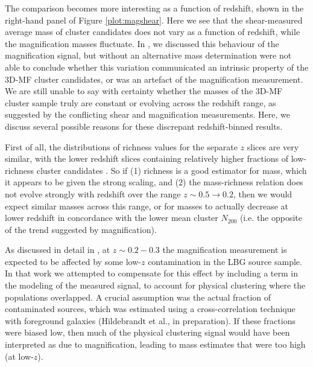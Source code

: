 The comparison becomes more interesting as a function of redshift, shown in the right-hand panel of Figure \ref{plot:magshear}. Here we see that the shear-measured average mass of cluster candidates does not vary as a function of redshift, while the magnification masses fluctuate. In \citet{Ford14}, we discussed this behaviour of the magnification signal, but without an alternative mass determination were not able to conclude whether this variation communicated an intrinsic property of the \ac{3D-MF} cluster candidates, or was an artefact of the magnification measurement. We are still unable to say with certainty whether the masses of the \ac{3D-MF} cluster sample truly are constant or evolving across the redshift range, as suggested by the conflicting shear and magnification measurements. Here, we discuss several possible reasons for these discrepant redshift-binned results. 

First of all, the distributions of richness values for the separate $z$ slices are very similar, with the lower redshift slices containing relatively higher fractions of low-richness cluster candidates \citep[see Figure 7 in][]{Ford14}. So if (1) richness is a good estimator for mass, which it appears to be given the strong scaling, and (2) the mass-richness relation does not evolve strongly with redshift over the range $z \sim 0.5 \rightarrow 0.2$, then we would expect similar masses across this range, or for masses to actually decrease at lower redshift in concordance with the lower mean cluster $N_{200}$ (i.e. the opposite of the trend suggested by magnification).

As discussed in detail in \citet{Ford14}, at $z \sim 0.2-0.3$ the magnification measurement is expected to be affected by some low-$z$ contamination in the \ac{LBG} source sample. In that work we attempted to compensate for this effect by including a term in the modeling of the measured signal, to account for physical clustering where the populations overlapped. A crucial assumption was the actual fraction of contaminated sources, which was estimated using a cross-correlation technique with foreground galaxies (Hildebrandt et al., in preparation). If these fractions were biased low, then much of the physical clustering signal would have been interpreted as due to magnification, leading to mass estimates that were too high (at low-$z$).

